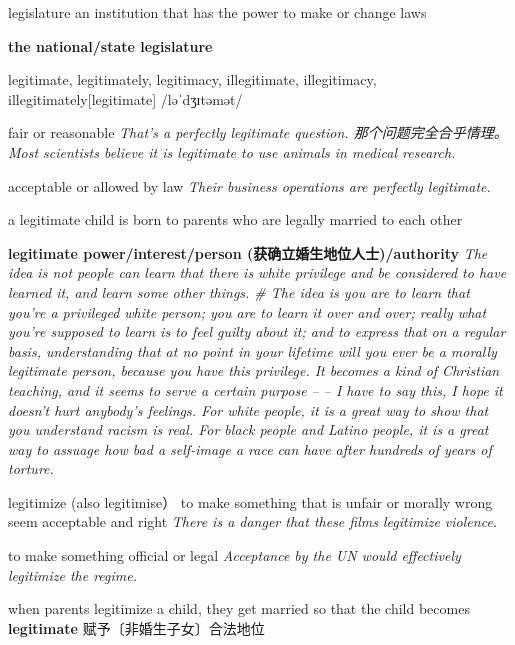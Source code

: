 \begin{DefWord}{legislature}
    an institution that has the power to make or change laws

    \textbf{the national/state legislature}
\end{DefWord}

\begin{DefWord}{legitimate, legitimately, legitimacy, illegitimate, illegitimacy, illegitimately}[legitimate]
    /ləˈdʒɪtəmət/

    fair or reasonable
    \textit{That's a perfectly legitimate question. 那个问题完全合乎情理。}
    \textit{Most scientists believe it is legitimate to use animals in medical research.}

    acceptable or allowed by law
    \textit{Their business operations are perfectly legitimate.}

    a legitimate child is born to parents who are legally married to each other

    \textbf{legitimate power/interest/person (获确立婚生地位人士)/authority}
    \textit{The idea is not people can learn that there is white privilege and be considered to have learned it, and learn some other things. \# The idea is you are to learn that you're a privileged white person; you are to learn it over and over; really what you're supposed to learn is to feel guilty about it; and to express that on a regular basis, understanding that at no point in your lifetime will you ever be a morally legitimate person, because you have this privilege. It becomes a kind of Christian teaching, and it seems to serve a certain purpose -- -- I have to say this, I hope it doesn't hurt anybody's feelings. For white people, it is a great way to show that you understand racism is real. For black people and Latino people, it is a great way to assuage how bad a self-image a race can have after hundreds of years of torture. }
\end{DefWord}

\begin{DefWord}{legitimize (also legitimise）}
    to make something that is unfair or morally wrong seem acceptable and right
    \textit{There is a danger that these films legitimize violence.}

    to make something official or legal
    \textit{Acceptance by the UN would effectively legitimize the regime.}

    when parents legitimize a child, they get married so that the child becomes \textbf{legitimate} 赋予〔非婚生子女〕合法地位

\end{DefWord}

